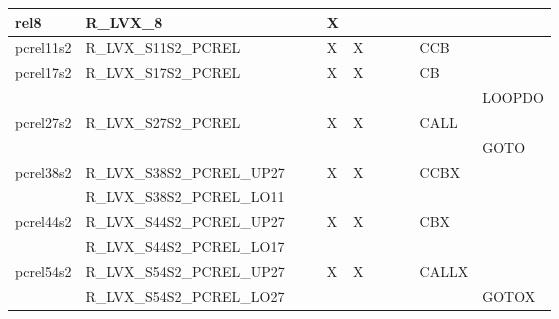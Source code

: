 {\begin{tabular}{|l|l|l|l|l|l|l|l|l|l|l|}
\hline
\textsf{rel8} & \textsf{R\_LVX\_8} & \textsf{} & \textsf{} & \textsf{X} & \textsf{} & \textsf{} & \textsf{} & \textsf{} & \textsf{} \\
\hline
\textsf{pcrel11s2} & \textsf{R\_LVX\_S11S2\_PCREL} & \textsf{} & \textsf{} & \textsf{X} & \textsf{X} & \textsf{} & \textsf{} & \textsf{} & \textsf{CCB} \\
\hline
\textsf{pcrel17s2} & \textsf{R\_LVX\_S17S2\_PCREL} & \textsf{} & \textsf{} & \textsf{X} & \textsf{X} & \textsf{} & \textsf{} & \textsf{} & \textsf{CB} \\
 & & & & & & & & & & \textsf{LOOPDO} \\
\hline
\textsf{pcrel27s2} & \textsf{R\_LVX\_S27S2\_PCREL} & \textsf{} & \textsf{} & \textsf{X} & \textsf{X} & \textsf{} & \textsf{} & \textsf{} & \textsf{CALL} \\
 & & & & & & & & & & \textsf{GOTO} \\
\hline
\textsf{pcrel38s2} & \textsf{R\_LVX\_S38S2\_PCREL\_UP27} & \textsf{} & \textsf{} & \textsf{X} & \textsf{X} & \textsf{} & \textsf{} & \textsf{} & \textsf{CCBX} \\
 & \textsf{R\_LVX\_S38S2\_PCREL\_LO11} & & & & & & & & & \\
\hline
\textsf{pcrel44s2} & \textsf{R\_LVX\_S44S2\_PCREL\_UP27} & \textsf{} & \textsf{} & \textsf{X} & \textsf{X} & \textsf{} & \textsf{} & \textsf{} & \textsf{CBX} \\
 & \textsf{R\_LVX\_S44S2\_PCREL\_LO17} & & & & & & & & & \\
\hline
\textsf{pcrel54s2} & \textsf{R\_LVX\_S54S2\_PCREL\_UP27} & \textsf{} & \textsf{} & \textsf{X} & \textsf{X} & \textsf{} & \textsf{} & \textsf{} & \textsf{CALLX} \\
 & \textsf{R\_LVX\_S54S2\_PCREL\_LO27} & & & & & & & & & \textsf{GOTOX} \\
\hline
\end{tabular}
}

